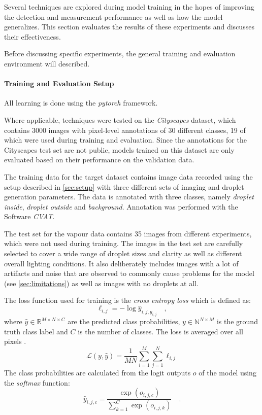 Several techniques are explored during model training in the hopes of improving the detection and measurement performance as well as how the model generalizes. 
This section evaluates the results of these experiments and discusses their effectiveness.

Before discussing specific experiments, the general training and evaluation environment will described.

\paragraph*{Training and Evaluation Setup}
All learning is done using the \emph{pytorch}\cite{paszkePyTorchImperativeStyle2019a} framework.

Where applicable, techniques were tested on the \emph{Cityscapes}\cite{cordtsCityscapesDatasetSemantic2016a} dataset, which contains 3000 images with pixel-level annotations of 30 different classes, 19 of which were used during training and evaluation.
Since the annotations for the Cityscapes test set are not public, models trained on this dataset are only evaluated based on their performance on the validation data. 

The training data for the target dataset contains image data recorded using the setup described in \ref{sec:setup} with three different sets of imaging and droplet generation parameters. The data is annotated with three classes, namely \emph{droplet inside}, \emph{droplet outside} and \emph{background}. Annotation was performed with the Software \emph{CVAT}\cite{CVAT_ai_Corporation_Computer_Vision_Annotation_2022}.

The test set for the vapour data contains 35 images from different experiments, which were not used during training. The images in the test set are carefully selected to cover a wide range of droplet sizes and clarity as well as different overall lighting conditions. It also deliberately includes images with a lot of artifacts and noise that are observed to commonly cause problems for the model (see \ref{sec:limitations}) as well as images with no droplets at all.

The loss function used for training is the \emph{cross entropy loss} which is defined as:
\begin{equation*}
    \ell_{i, j} = -\log\hat{y}_{i, j, y_{i, j}}\quad,
\end{equation*}
where $\hat{y} \in \mathbb{R}^{M \times N \times C}$ are the predicted class probabilities, $y \in \mathbb{N}^{N \times M}$ is the ground truth class label and $C$ is the number of classes. The loss is averaged over all pixels \cite{CrossEntropyLossPyTorch13}.
\begin{equation*}
    \mathcal{L}(y, \hat{y}) = \frac{1}{MN} \sum_{i=1}^M \sum_{j=1}^N \ell_{i, j}
\end{equation*}
The class probabilities are calculated from the logit outputs $o$ of the model using the \emph{softmax} function:
\begin{equation*}
    \hat{y}_{i, j, c} = \frac{\exp(o_{i, j, c})}{\sum_{k=1}^C \exp(o_{i, j, k})}\quad.
\end{equation*}

